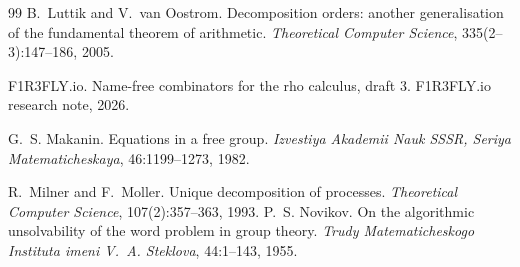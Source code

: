 \documentclass[11pt]{article}
\theoremstyle{definition}
\theoremstyle{remark}
\begin{document}
\begin{thebibliography}{99}
B.~Luttik and V.~van Oostrom.
\newblock Decomposition orders: another generalisation of the fundamental
  theorem of arithmetic.
\newblock \emph{Theoretical Computer Science}, 335(2--3):147--186, 2005.

F1R3FLY.io.
\newblock Name-free combinators for the rho calculus, draft 3.
\newblock F1R3FLY.io research note, 2026.

G.~S. Makanin.
\newblock Equations in a free group.
\newblock \emph{Izvestiya Akademii Nauk SSSR, Seriya Matematicheskaya},
  46:1199--1273, 1982.

R.~Milner and F.~Moller.
\newblock Unique decomposition of processes.
\newblock \emph{Theoretical Computer Science}, 107(2):357--363, 1993.
P.~S. Novikov.
\newblock On the algorithmic unsolvability of the word problem in group
  theory.
\newblock \emph{Trudy Matematicheskogo Instituta imeni V.~A. Steklova},
  44:1--143, 1955.
\end{thebibliography}
\end{document}
